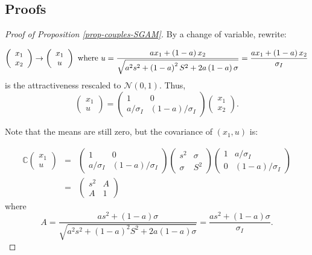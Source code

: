 \documentclass[
  12pt,
]{article}
\theoremstyle{definition}
\theoremstyle{definition}
\theoremstyle{definition}
\theoremstyle{definition}
\theoremstyle{remark}
\begin{document}
\localtableofcontents
\clearpage

\hypertarget{proofs}{%
\subsection{Proofs}\label{proofs}}

\begin{proof}[Proof of Proposition \ref{prop-couples-SGAM}]

By a change of variable, rewrite:

\[
\left( 
\begin{array}{c}
x_{1} \\ 
x_{2}%
\end{array}%
\right) \rightarrow \left( 
\begin{array}{c}
x_{1} \\ 
u%
\end{array}%
\right) \text{ where }u=\frac{ax_{1}+\left( 1-a\right) x_{2}}{\sqrt{%
a^{2}s^{2}+\left( 1-a\right) ^{2}S^{2}+2a\left( 1-a\right) \sigma }}=
\frac{ax_{1}+\left( 1-a\right) x_{2}}{\sigma_I}
\]
is the attractiveness rescaled to $\mathcal{N}(0, 1)$. Thus,
\[
\left( 
\begin{array}{c}
x_{1} \\ 
u
\end{array}
\right) = \left( 
\begin{array}{cc}
1 & 0 \\ 
a/\sigma_I & (1-a)/\sigma_I%
\end{array}%
\right) \left( 
\begin{array}{c}
x_{1} \\ 
x_{2}%
\end{array}%
\right). 
\]


Note that the means are still zero, but the covariance of $(x_1,u)$ is:

\begin{eqnarray*}
\mathbb{C}\left( 
\begin{array}{c}
x_{1} \\ 
u
\end{array}
\right) &=&\left( 
\begin{array}{cc}
1 & 0 \\ 
a/\sigma_I & \left( 1-a\right)/\sigma_I%
\end{array}%
\right) \left( 
\begin{array}{cc}
s^{2} & \sigma \\ 
\sigma & S^{2}%
\end{array}%
\right) \left( 
\begin{array}{cc}
1 & a/\sigma_I \\ 
0 & \left( 1-a\right)/\sigma_I%
\end{array}%
\right) \\
&=&\left( 
\begin{array}{cc}
s^{2} &  A \\ 
A & 1 
\end{array}%
\right) \allowbreak 
\end{eqnarray*}
where
\[
A=\frac{
as^{2}+\left( 1-a\right) \sigma 
}{
\sqrt{
a^{2}s^{2} + (1-a)^2S^{2}
+ 2a\left(1-a\right)\sigma 
}} = 
\frac{as^{2}+\left( 1-a\right) \sigma }{\sigma_I}.
\]


\end{proof}
\end{document}
